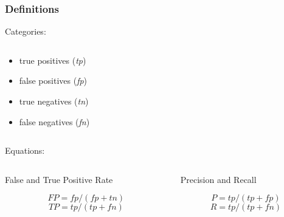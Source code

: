 \documentclass{beamer}
\begin{document}
\begin{frame}
\frametitle[Definitions]{Definitions}
\begin{center}
Categories:
\end{center}
\begin{columns}
\begin{column}{0.5\textwidth}
{\footnotesize
\begin{itemize}
\item true positives (\textit{tp})
\item false positives (\textit{fp})
\item true negatives (\textit{tn})
\item false negatives (\textit{fn})
\end{itemize}
}
\end{column}
\begin{column}{0.5\textwidth}
\begin{table}
\end{table}
\end{column}
\end{columns}
\begin{center}
Equations:
\end{center}
\begin{columns}
\begin{column}{0.5\textwidth}
{\footnotesize
\begin{center}
False and True Positive Rate
\end{center}
\begin{equation*}
FP = fp / (fp + tn)
\end{equation*}
\begin{equation*}
TP = tp / (tp + fn)
\end{equation*}
}
\end{column}
\begin{column}{0.5\textwidth}
{\footnotesize
\begin{center}
Precision and Recall
\end{center}
\begin{equation*}
P = tp / (tp + fp)
\end{equation*}
\begin{equation*}
R = tp / (tp + fn)
\end{equation*}
}
\end{column}
\end{columns}
\end{frame}
\end{document}
